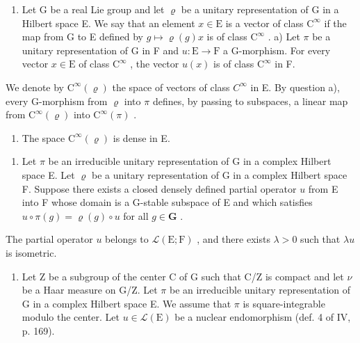 \begin{enumerate}
\def\labelenumi{\arabic{enumi})}
\setcounter{enumi}{11}
\tightlist
\item
  Let G be a real Lie group and let \(\varrho\) be a unitary representation of G in a Hilbert space E. We say that an element \(x \in \mathrm{E}\) is a vector of class \(\mathrm{C}^{\infty}\) if the map from G to E defined by \(g \mapsto \varrho(g)x\) is of class \(\mathrm{C}^{\infty}\) . a) Let \(\pi\) be a unitary representation of G in F and \(u: \mathrm{E} \to \mathrm{F}\) a G-morphism. For every vector \(x \in \mathrm{E}\) of class \(\mathrm{C}^{\infty}\) , the vector \(u(x)\) is of class \(\mathrm{C}^{\infty}\) in F.
\end{enumerate}

We denote by \(\mathrm{C}^{\infty}(\varrho)\) the space of vectors of class \(C^{\infty}\) in E. By question a), every G-morphism from \(\varrho\) into \(\pi\) defines, by passing to subspaces, a linear map from \(\mathrm{C}^{\infty}(\varrho)\) into \(\mathrm{C}^{\infty}(\pi)\) .

\begin{enumerate}
\def\labelenumi{\alph{enumi})}
\setcounter{enumi}{1}
\tightlist
\item
  The space \(\mathrm{C}^{\infty}(\varrho)\) is dense in E.
\end{enumerate}

\begin{enumerate}
\def\labelenumi{\arabic{enumi})}
\setcounter{enumi}{12}
\tightlist
\item
  Let \(\pi\) be an irreducible unitary representation of G in a complex Hilbert space E. Let \(\varrho\) be a unitary representation of G in a complex Hilbert space F. Suppose there exists a closed densely defined partial operator \(u\) from E into F whose domain is a G-stable subspace of E and which satisfies \(u \circ \pi(g) = \varrho(g) \circ u\) for all \(g \in \mathbf{G}\) .
\end{enumerate}

The partial operator \(u\) belongs to \(\mathcal{L}(\mathrm{E};\mathrm{F})\) , and there exists \(\lambda > 0\) such that \(\lambda u\) is isometric.

\begin{enumerate}
\def\labelenumi{\arabic{enumi})}
\setcounter{enumi}{13}
\tightlist
\item
  Let Z be a subgroup of the center C of G such that C/Z is compact and let \(\nu\) be a Haar measure on G/Z. Let \(\pi\) be an irreducible unitary representation of G in a complex Hilbert space E. We assume that \(\pi\) is square-integrable modulo the center. Let \(u \in \mathcal{L}(\mathrm{E})\) be a nuclear endomorphism (def. 4 of IV, p. 169).
\end{enumerate}

